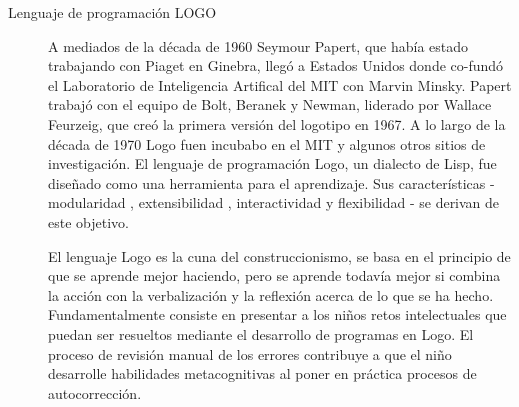 \begin{description}

\item[Lenguaje de programación LOGO]  A mediados de la década de 1960 Seymour Papert, que había 
	estado trabajando con Piaget en Ginebra, llegó a Estados Unidos donde
	co-fundó el Laboratorio de Inteligencia Artifical del MIT con Marvin
	Minsky. Papert trabajó con el equipo de Bolt, Beranek y Newman, 
	liderado por Wallace Feurzeig, que creó la primera versión del logotipo
	en 1967. A lo largo de la década de 1970 Logo fuen incubabo en el MIT y 
	algunos otros sitios de investigación. El lenguaje de programación Logo,
	un dialecto de Lisp, fue diseñado como una herramienta para el aprendizaje.
	Sus características - modularidad , extensibilidad , interactividad y 
	flexibilidad - se derivan de este objetivo. 

	El lenguaje Logo es la cuna del construccionismo, se basa en el principio de que se aprende mejor
	haciendo, pero se aprende todavía mejor si combina la acción con la
	verbalización  y la reflexión acerca de lo que se ha hecho. 
	Fundamentalmente consiste en presentar a los niños retos intelectuales
	que puedan ser resueltos mediante el desarrollo de programas en Logo. 
	El proceso de revisión manual de los errores contribuye a que el niño 
	desarrolle habilidades metacognitivas al poner en práctica procesos de 
	autocorrección\cite{logo:sg}.





\end{description}
